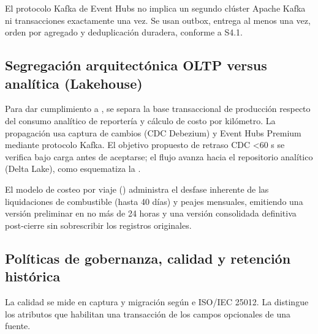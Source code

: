 
El protocolo Kafka de Event Hubs no implica un segundo clúster Apache Kafka ni transacciones exactamente una vez. Se usan outbox, entrega al menos una vez, orden por agregado y deduplicación duradera, conforme a S4.1.

\FloatBarrier
\subsection{Segregación arquitectónica OLTP versus analítica (Lakehouse)}\label{sec:5-oltp-olap}\label{sec:05-segregacion-arquitectonica-oltp-versus-analitica-lakehouse}

Para dar cumplimiento a , se separa la base transaccional de producción respecto del consumo analítico de reportería y cálculo de costo por kilómetro. La propagación usa captura de cambios (CDC Debezium) y Event Hubs Premium mediante protocolo Kafka. El objetivo propuesto de retraso CDC <60 s se verifica bajo carga antes de aceptarse; el flujo avanza hacia el repositorio analítico (Delta Lake), como esquematiza la .


El modelo de costeo por viaje () administra el desfase inherente de las liquidaciones de combustible (hasta 40 días) y peajes mensuales, emitiendo una versión preliminar en no más de 24 horas y una versión consolidada definitiva post-cierre sin sobrescribir los registros originales.

\FloatBarrier
\subsection{Políticas de gobernanza, calidad y retención histórica}\label{sec:5-gobernanza}\label{sec:05-politicas-de-gobernanza-calidad-y-retencion-historica}

La calidad se mide en captura y migración según  e ISO/IEC 25012. La  distingue los atributos que habilitan una transacción de los campos opcionales de una fuente.

